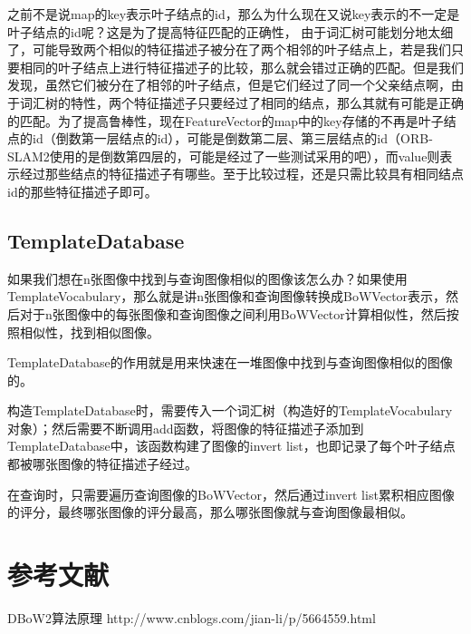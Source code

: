 之前不是说map的key表示叶子结点的id，那么为什么现在又说key表示的不一定是叶子结点的id呢？这是为了提高特征匹配的正确性，
由于词汇树可能划分地太细了，可能导致两个相似的特征描述子被分在了两个相邻的叶子结点上，若是我们只要相同的叶子结点上进行特征描述子的比较，那么就会错过正确的匹配。但是我们发现，虽然它们被分在了相邻的叶子结点，但是它们经过了同一个父亲结点啊，由于词汇树的特性，两个特征描述子只要经过了相同的结点，那么其就有可能是正确的匹配。为了提高鲁棒性，现在FeatureVector的map中的key存储的不再是叶子结点的id（倒数第一层结点的id），可能是倒数第二层、第三层结点的id（ORB-SLAM2使用的是倒数第四层的，可能是经过了一些测试采用的吧），而value则表示经过那些结点的特征描述子有哪些。至于比较过程，还是只需比较具有相同结点id的那些特征描述子即可。


\subsection{TemplateDatabase}
如果我们想在n张图像中找到与查询图像相似的图像该怎么办？如果使用TemplateVocabulary，那么就是讲n张图像和查询图像转换成BoWVector表示，然后对于n张图像中的每张图像和查询图像之间利用BoWVector计算相似性，然后按照相似性，找到相似图像。


TemplateDatabase的作用就是用来快速在一堆图像中找到与查询图像相似的图像的。

构造TemplateDatabase时，需要传入一个词汇树（构造好的TemplateVocabulary对象）；然后需要不断调用add函数，将图像的特征描述子添加到TemplateDatabase中，该函数构建了图像的invert list，也即记录了每个叶子结点都被哪张图像的特征描述子经过。

在查询时，只需要遍历查询图像的BoWVector，然后通过invert list累积相应图像的评分，最终哪张图像的评分最高，那么哪张图像就与查询图像最相似。



\section{参考文献}
DBoW2算法原理 http://www.cnblogs.com/jian-li/p/5664559.html

